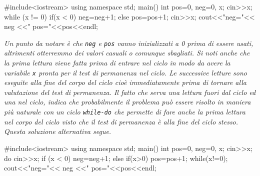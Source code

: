 \documentclass[a4paper,12pt]{book}
\begin{document}
\begin{codice}
#include<iostream> 
using namespace std; 
main() { 
  int pos=0, neg=0, x; cin>>x; 
  while (x != 0) {
    if(x < 0)
      neg=neg+1;
    else
      pos=pos+1;
    cin>>x;
  }
  cout<<"neg="<< neg <<" pos="<<pos<<endl;
}
\end{codice}


\noindent \textit{Un punto da notare è che \texttt{neg} e \texttt{pos} vanno inizializzati a 0 prima di essere usati, altrimenti otterremmo dei valori casuali o comunque sbagliati. Si noti anche che la prima lettura viene fatta prima di entrare nel ciclo in modo da avere la variabile \texttt{x} pronta per il test di permanenza nel ciclo. Le successive letture sono eseguite alla fine del corpo del ciclo cioè immediatamente prima di tornare alla valutazione del test di permanenza. Il fatto che serva una lettura fuori dal ciclo ed una nel ciclo, indica che probabilmente il problema può essere risolto in maniera più naturale con un ciclo \texttt{while-do} che permette di fare anche la prima lettura nel corpo del ciclo visto che il test di permanenza è alla fine del ciclo stesso. Questa soluzione alternativa segue.}

\begin{codice}
#include<iostream> 
using namespace std; 
main() { 
  int pos=0, neg=0, x; cin>>x; 
  do {
   cin>>x;
   if (x < 0)
     neg=neg+1;
   else
     if(x>0)
       pos=pos+1;
  } while(x!=0);
  cout<<"neg="<< neg <<" pos="<<pos<<endl;
}
\end{codice}
\end{document}
